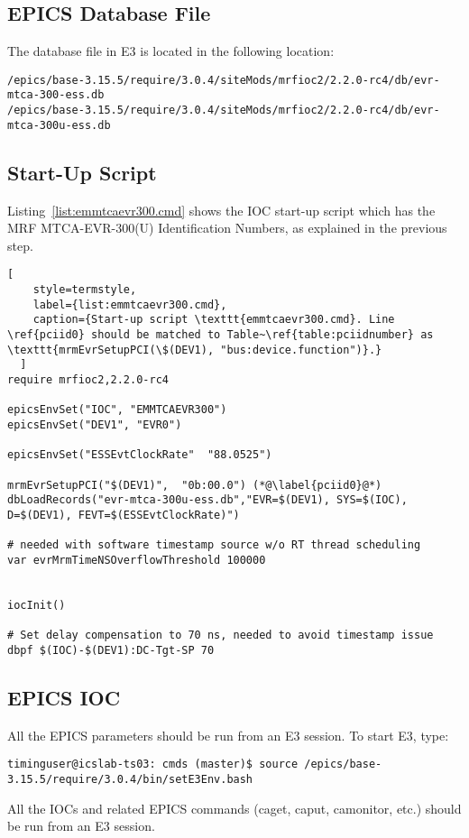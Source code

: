 \documentclass[11pt
  , a4paper
  , article
  , oneside
  , showtrims
]{memoir}
\begin{document}
{\subsection{EPICS Database File}
The database file in E3 is located in the following location:
\begin{lstlisting}[style=termstyle]
/epics/base-3.15.5/require/3.0.4/siteMods/mrfioc2/2.2.0-rc4/db/evr-mtca-300-ess.db
/epics/base-3.15.5/require/3.0.4/siteMods/mrfioc2/2.2.0-rc4/db/evr-mtca-300u-ess.db
\end{lstlisting}

\subsection{Start-Up Script}
Listing~\ref{list:emmtcaevr300.cmd} shows the IOC start-up script which has the MRF MTCA-EVR-300(U) Identification Numbers, as explained in the previous step.

\begin{lstlisting}[
    style=termstyle,
    label={list:emmtcaevr300.cmd},
    caption={Start-up script \texttt{emmtcaevr300.cmd}. Line \ref{pciid0} should be matched to Table~\ref{table:pciidnumber} as \texttt{mrmEvrSetupPCI(\$(DEV1), "bus:device.function")}.}
  ]
require mrfioc2,2.2.0-rc4

epicsEnvSet("IOC", "EMMTCAEVR300")
epicsEnvSet("DEV1", "EVR0")

epicsEnvSet("ESSEvtClockRate"  "88.0525")

mrmEvrSetupPCI("$(DEV1)",  "0b:00.0") (*@\label{pciid0}@*)
dbLoadRecords("evr-mtca-300u-ess.db","EVR=$(DEV1), SYS=$(IOC), D=$(DEV1), FEVT=$(ESSEvtClockRate)")

# needed with software timestamp source w/o RT thread scheduling
var evrMrmTimeNSOverflowThreshold 100000


iocInit()

# Set delay compensation to 70 ns, needed to avoid timestamp issue
dbpf $(IOC)-$(DEV1):DC-Tgt-SP 70
\end{lstlisting}

\subsection{EPICS IOC}
All the EPICS parameters should be run from an E3 session. To start E3, type:
\begin{lstlisting}[style=termstyle]
timinguser@icslab-ts03: cmds (master)$ source /epics/base-3.15.5/require/3.0.4/bin/setE3Env.bash
\end{lstlisting}
All the IOCs and related EPICS commands (caget, caput, camonitor, etc.) should be run from an E3 session.

}
\end{document}
